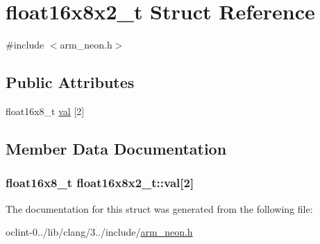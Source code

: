 \hypertarget{structfloat16x8x2__t}{\section{float16x8x2\-\_\-t Struct Reference}
\label{structfloat16x8x2__t}
}


{\ttfamily \#include $<$arm\-\_\-neon.\-h$>$}

\subsection*{Public Attributes}
\begin{DoxyCompactItemize}
\item 
float16x8\-\_\-t \hyperlink{structfloat16x8x2__t_a0582aad3a890f024268bf9c8f075fa26}{val} \mbox{[}2\mbox{]}
\end{DoxyCompactItemize}


\subsection{Member Data Documentation}
\hypertarget{structfloat16x8x2__t_a0582aad3a890f024268bf9c8f075fa26}{
\subsubsection[{val}]{\setlength{\rightskip}{0pt plus 5cm}float16x8\-\_\-t float16x8x2\-\_\-t\-::val\mbox{[}2\mbox{]}}}\label{structfloat16x8x2__t_a0582aad3a890f024268bf9c8f075fa26}


The documentation for this struct was generated from the following file\-:\begin{DoxyCompactItemize}
\item 
oclint-\/0../lib/clang/3../include/\hyperlink{arm__neon_8h}{arm\-\_\-neon.\-h}\end{DoxyCompactItemize}
